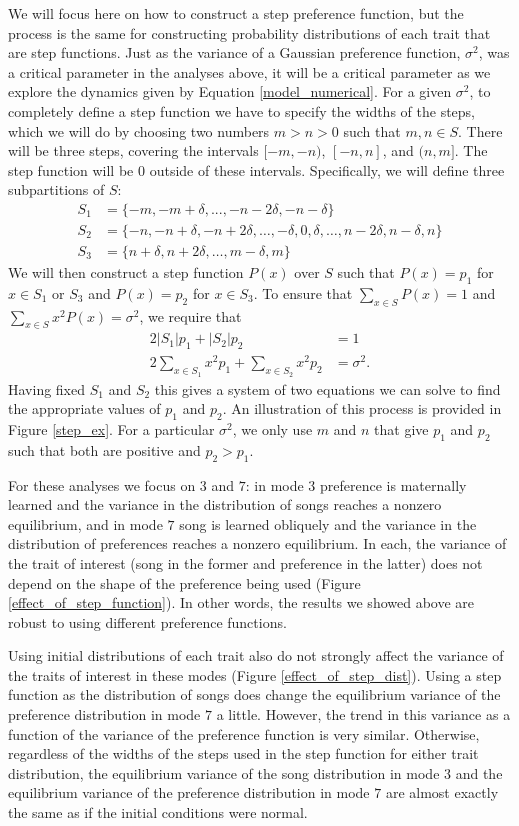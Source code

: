 \documentclass{article}
\begin{document}
We will focus here on how to construct a step preference function, but the process is the same for constructing probability distributions of each trait that are step functions. Just as the variance of a Gaussian preference function, $\sigma^2$, was a critical parameter in the analyses above, it will be a critical parameter as we explore the dynamics given by Equation \ref{model_numerical}. For a given $\sigma^2$, to completely define a step function we have to specify the widths of the steps, which we will do by choosing two numbers $m>n>0$ such that $m,n\in S$. There will be three steps, covering the intervals $[-m,-n)$, $[-n,n]$, and $(n,m]$. The step function will be $0$ outside of these intervals. Specifically, we will define three subpartitions of $S$:
\begin{align*}
S_1 & = \{-m,-m+\delta,...,-n-2\delta,-n-\delta\}
\\ S_2&=\{-n,-n+\delta,-n+2\delta,\dots,-\delta,0,\delta,\dots,n-2\delta,n-\delta,n\}
\\ S_3&=\{n+\delta,n+2\delta,\dots,m-\delta,m\}
\end{align*}
We will then construct a step function $P(x)$ over $S$ such that $P(x)=p_1$ for $x\in S_1$ or $S_3$ and $P(x)=p_2$ for $x\in S_3$. To ensure that $\sum_{x\in S}P(x)=1$ and $\sum_{x\in S}x^2P(x)=\sigma^2$, we require that 
\begin{align*}
2|S_1|p_1+|S_2|p_2&=1
\\2\sum_{x\in S_1}x^2p_1+\sum_{x\in S_2}x^2p_2&=\sigma^2.
\end{align*}
Having fixed $S_1$ and $S_2$ this gives a system of two equations we can solve to find the appropriate values of $p_1$ and $p_2$. An illustration of this process is provided in Figure \ref{step_ex}. For a particular $\sigma^2$, we only use $m$ and $n$ that give $p_1$ and $p_2$ such that both are positive and $p_2>p_1$.

For these analyses we focus on $3$ and $7$: in mode $3$ preference is maternally learned and the variance in the distribution of songs reaches a nonzero equilibrium, and in mode $7$ song is learned obliquely and the variance in the distribution of preferences reaches a nonzero equilibrium. In each, the variance of the trait of interest (song in the former and preference in the latter) does not depend on the shape of the preference being used (Figure \ref{effect_of_step_function}). In other words, the results we showed above are robust to using different preference functions.

Using initial distributions of each trait also do not strongly affect the variance of the traits of interest in these modes (Figure \ref{effect_of_step_dist}). Using a step function as the distribution of songs does change the equilibrium variance of the preference distribution in mode $7$ a little. However, the trend in this variance as a function of the variance of the preference function is very similar. Otherwise, regardless of the widths of the steps used in the step function for either trait distribution, the equilibrium variance of the song distribution in mode $3$ and the equilibrium variance of the preference distribution in mode $7$ are almost exactly the same as if the initial conditions were normal. 
\end{document}
